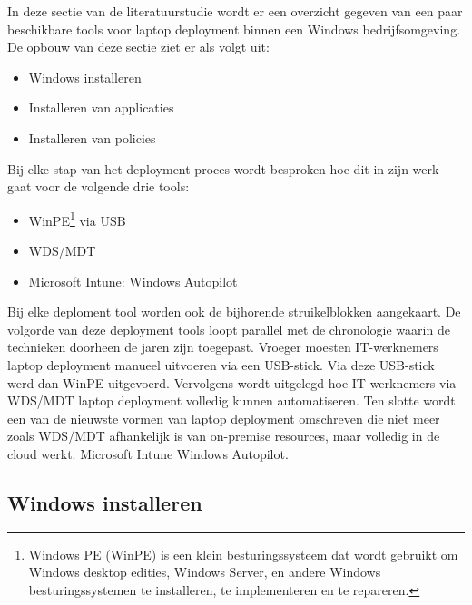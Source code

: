 In deze sectie van de literatuurstudie wordt er een overzicht gegeven van een paar beschikbare tools voor laptop deployment binnen een Windows bedrijfsomgeving. De opbouw van deze sectie ziet er als volgt uit:

\begin{itemize}

    \item Windows installeren

    \item Installeren van applicaties

    \item Installeren van policies

\end{itemize}

Bij elke stap van het deployment proces wordt besproken hoe dit in zijn werk gaat voor de volgende drie tools:

\begin{itemize}

    \item WinPE\footnote{Windows PE (WinPE) is een klein besturingssysteem dat wordt gebruikt om Windows desktop edities, Windows Server, en andere Windows besturingssystemen te installeren, te implementeren en te repareren.} via USB

    \item WDS/MDT

    \item Microsoft Intune: Windows Autopilot

\end{itemize}


Bij elke deploment tool worden ook de bijhorende struikelblokken aangekaart. De volgorde van deze deployment tools loopt parallel met de chronologie waarin de technieken doorheen de jaren zijn toegepast. Vroeger moesten IT-werknemers laptop deployment manueel uitvoeren via een USB-stick. Via deze USB-stick werd dan WinPE uitgevoerd. Vervolgens wordt uitgelegd hoe IT-werknemers via WDS/MDT laptop deployment volledig kunnen automatiseren. Ten slotte wordt een van de nieuwste vormen van laptop deployment omschreven die niet meer zoals WDS/MDT afhankelijk is van on-premise resources, maar volledig in de cloud werkt: Microsoft Intune Windows Autopilot.

\subsection{Windows installeren}

